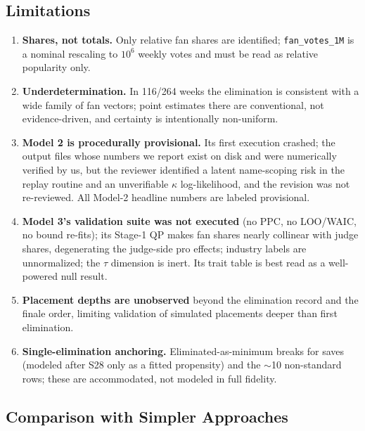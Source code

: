 \documentclass[11pt]{article}
\begin{document}
\subsection{Limitations}

\begin{enumerate}[itemsep=1pt]
  \item \textbf{Shares, not totals.} Only relative fan shares are identified;
        \texttt{fan\_votes\_1M} is a nominal rescaling to $10^6$ weekly votes and must
        be read as relative popularity only.
  \item \textbf{Underdetermination.} In 116/264 weeks the elimination is consistent
        with a wide family of fan vectors; point estimates there are conventional, not
        evidence-driven, and certainty is intentionally non-uniform.
  \item \textbf{Model 2 is procedurally provisional.} Its first execution crashed; the
        output files whose numbers we report exist on disk and were numerically
        verified by us, but the reviewer identified a latent name-scoping risk in the
        replay routine and an unverifiable $\kappa$ log-likelihood, and the revision
        was not re-reviewed. All Model-2 headline numbers are labeled provisional.
  \item \textbf{Model 3's validation suite was not executed} (no PPC, no LOO/WAIC, no
        bound re-fits); its Stage-1 QP makes fan shares nearly collinear with judge
        shares, degenerating the judge-side pro effects; industry labels are
        unnormalized; the $\tau$ dimension is inert. Its trait table is best read as a
        well-powered null result.
  \item \textbf{Placement depths are unobserved} beyond the elimination record and the
        finale order, limiting validation of simulated placements deeper than first
        elimination.
  \item \textbf{Single-elimination anchoring.} Eliminated-as-minimum breaks for saves
        (modeled after S28 only as a fitted propensity) and the $\sim$10 non-standard
        rows; these are accommodated, not modeled in full fidelity.
\end{enumerate}

\subsection{Comparison with Simpler Approaches}
\end{document}
